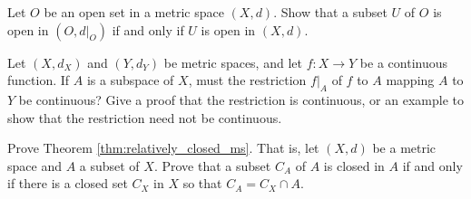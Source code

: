 \item Let $O$ be an open set in a metric space $(X,d)$. Show that a subset $U$ of $O$ is open in $(O, d|_O)$ if and only if $U$ is open in $(X,d)$. 

\begin{comment}

\ExerciseSolution Let $U$ be an open set in $O$. Then $U = O \cap V$ for some open set $V$ in $X$ by definition. Since $O$ is open in $X$, it follows that $O \cap V$ is open in $X$. Thus, $U$ is open in $X$.

Conversely, suppose that $U \subset O$ and that $U$ is open in $X$. Then $U = O \cap U$ and $U$ is open in $O$. 

\end{comment}

\item Let $(X,d_X)$ and $(Y, d_Y)$ be metric spaces, and let $f : X \to Y$ be a continuous function. If $A$ is a subspace of $X$, must the restriction $f|_A$ of $f$ to $A$ mapping $A$ to $Y$ be continuous? Give a proof that the restriction is continuous, or an example to show that the restriction need not be continuous.

\begin{comment}

\ExerciseSolution Let $(X,d_X)$ and $(Y, d_Y)$ be metric spaces, and let $f : X \to Y$ be a continuous function. Let $A$ be a subspace of $X$. We will prove that $f|_A : A \to Y$ is continuous. Let $O$ be an open subset of $Y$. Since $f$ is continuous, we know that $f^{-1}(O)$ is open in $X$. We will demonstrate that $(f|_A)^{-1}(O) = A \cap f^{-1}(O)$. This will prove that $(f|_A)^{-1}(O)$ is an open subset of $A$ and that $f|_A$ is continuous. 

Let $x \in (f|_A)^{-1}(O)$. Then $x \in A$ and $f|_A(x) \in O$. But $f|_A(x) = f(x)$, so $f(x) \in O$ and $x \in f^{-1}(O)$. So $x \in A \cap f^{-1}(O)$ and $(f|_A)^{-1}(O) \subseteq A \cap f^{-1}(O)$. 

Now suppose that $x \in A \cap f^{-1}(O)$. Then $x \in A$ and $x \in f^{-1}(O)$. So $f(x) \in O$ and $x \in A$. Thus, $f|_A(x) \in O$ and $x \in (f|_A)^{-1}(O)$. It follows that $A \cap f^{-1}(O) \subseteq (f|_A)^{-1}(O)$. The two containments show that $A \cap f^{-1}(O) = (f|_A)^{-1}(O)$.

\end{comment}

\item \label{ex:relatively_closed_ms} Prove Theorem \ref{thm:relatively_closed_ms}. That is, let $(X,d)$ be a metric space and $A$ a subset of $X$. Prove that a subset $C_A$ of $A$ is closed in $A$ if and only if there is a closed set $C_X$ in $X$ so that $C_A = C_X \cap A$. 

